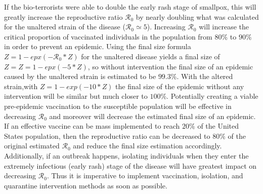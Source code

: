 If the bio-terrorists were able to double the early rash stage of smallpox, this will greatly increase the reproductive ratio $\mathcal R_0$ by nearly doubling what was calculated for the unaltered strain of the disease ($\mathcal R_0 \simeq 5$). Increasing $\mathcal R_0$ will increase the critical proportion of vaccinated individuals in the population from $80\%$ to $90\%$ in order to prevent an epidemic. Using the final size formula $Z=1-epx(-\mathcal R_0*Z)$ for the unaltered disease yields a final size of $Z=Z=1-epx(-5*Z)$, so without intervention the final size of an epidemic caused by the unaltered strain is estimated to be $99.3\%$. With the altered strain,with $Z=1-exp(-10*Z)$ the final size of the epidemic without any intervention will be similar but much closer to $100\%$. Potentially creating a viable pre-epidemic vaccination to the susceptible population will be effective in decreasing  $\mathcal R_0$ and moreover will decrease the estimated final size of an epidemic. If an effective vaccine can be mass implemented to reach $20\%$ of the United States population, then the reproductive ratio can be decreased to $80\%$ of the original estimated $\mathcal R_0$ and reduce the final size estimation accordingly. Additionally, if an outbreak happens, isolating individuals when they enter the extremely infectious (early rash) stage of the disease will have greatest impact on decreasing $\mathcal R_0$. Thus it is imperative to implement vaccination, isolation, and quarantine intervention methods as soon as possible. 
